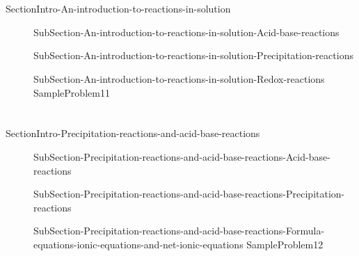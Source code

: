 \documentclass[main.tex]{subfiles} %
\newcommand\chapterlabel{Ch-electrolytes}\setcounter{figurenewcounter}{0}\setcounter{tablenewcounter}{0}\setcounter{formulanewcounter}{0}\chapterpicture{../{\chapterlabel}/figure1}\chapterpicturelabel{PxFuel}
\begin{document}
\section{\color{blue!30!black}{An introduction to reactions in solution}}{SectionIntro-An-introduction-to-reactions-in-solution}
\sloppy \begin{description}
\item[] {SubSection-An-introduction-to-reactions-in-solution-Acid-base-reactions}
\item[]{SubSection-An-introduction-to-reactions-in-solution-Precipitation-reactions}
\item[]{SubSection-An-introduction-to-reactions-in-solution-Redox-reactions}
{SampleProblem11}
\end{description}


\section{\color{blue!30!black}{Precipitation reactions and acid-base reactions}}{SectionIntro-Precipitation-reactions-and-acid-base-reactions}
\sloppy \begin{description}
\item[]{SubSection-Precipitation-reactions-and-acid-base-reactions-Acid-base-reactions}
\item[] {SubSection-Precipitation-reactions-and-acid-base-reactions-Precipitation-reactions}
\item[]{SubSection-Precipitation-reactions-and-acid-base-reactions-Formula-equations-ionic-equations-and-net-ionic-equations}
{SampleProblem12}%
\end{description}

\end{document}
